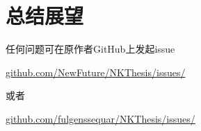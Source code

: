 \documentclass[12pt,openright]{book}
\begin{document}
\chapter{总结展望}

任何问题可在原作者GitHub上发起issue 

\href{https://github.com/NewFuture/NKThesis/issues/new}{github.com/NewFuture/NKThesis/issues/}

或者

\href{https://github.com/fulgenssequar/NKThesis/issues/new}{github.com/fulgenssequar/NKThesis/issues/}
\end{document}
